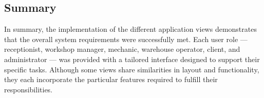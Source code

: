 \subsection{Summary}

In summary, the implementation of the different application views demonstrates that the overall system requirements were successfully met. Each user role — receptionist, workshop manager, mechanic, warehouse operator, client, and administrator — was provided with a tailored interface designed to support their specific tasks. Although some views share similarities in layout and functionality, they each incorporate the particular features required to fulfill their responsibilities. 







